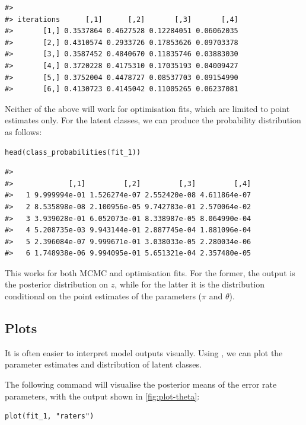 \begin{verbatim}
#>           
#> iterations      [,1]      [,2]       [,3]       [,4]
#>       [1,] 0.3537864 0.4627528 0.12284051 0.06062035
#>       [2,] 0.4310574 0.2933726 0.17853626 0.09703378
#>       [3,] 0.3587452 0.4840670 0.11835746 0.03883030
#>       [4,] 0.3720228 0.4175310 0.17035193 0.04009427
#>       [5,] 0.3752004 0.4478727 0.08537703 0.09154990
#>       [6,] 0.4130723 0.4145042 0.11005265 0.06237081
\end{verbatim}

Neither of the above will work for optimisation fits, which are limited to
point estimates only. For the latent classes, we can produce the probability
distribution as follows:

\begin{verbatim}
head(class_probabilities(fit_1))
\end{verbatim}

\begin{verbatim}
#>    
#>             [,1]         [,2]         [,3]         [,4]
#>   1 9.999994e-01 1.526274e-07 2.552420e-08 4.611864e-07
#>   2 8.535898e-08 2.100956e-05 9.742783e-01 2.570064e-02
#>   3 3.939028e-01 6.052073e-01 8.338987e-05 8.064990e-04
#>   4 5.208735e-03 9.943144e-01 2.887745e-04 1.881096e-04
#>   5 2.396084e-07 9.999671e-01 3.038033e-05 2.280034e-06
#>   6 1.748938e-06 9.994095e-01 5.651321e-04 2.357480e-05
\end{verbatim}

This works for both MCMC and optimisation fits. For the former, the output is
the posterior distribution on \(z\), while for the latter it is the distribution
conditional on the point estimates of the parameters (\(\pi\) and \(\theta\)).

\hypertarget{plots}{%
\subsection{Plots}\label{plots}}

It is often easier to interpret model outputs visually.
Using , we can plot the parameter estimates and
distribution of latent classes.

The following command will visualise the posterior means of the error rate
parameters, with the output shown in \autoref{fig:plot-theta}:

\begin{verbatim}
plot(fit_1, "raters")
\end{verbatim}

